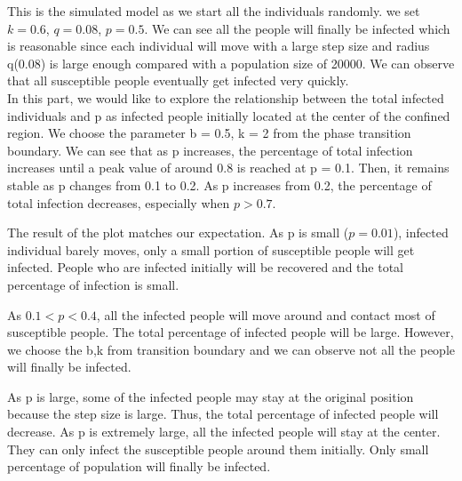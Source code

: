 \documentclass{article}
\begin{document}
This is the simulated model as we start all the individuals randomly. we set $k = 0.6$, $q = 0.08$, $p = 0.5$. We can see all the people will  finally be infected which is reasonable since each individual will move with a large step size and radius q(0.08) is large enough compared with a population size of 20000. We can observe that all susceptible people eventually get infected very quickly.\\

In this part, we would like to explore the relationship between the total infected individuals and p as infected people initially located at the center of the confined region. We choose the parameter b = 0.5, k = 2 from the phase transition boundary.
We can see that as p increases, the percentage of total infection increases until a peak value of around 0.8 is reached at p = 0.1. Then, it remains stable as p changes from 0.1 to 0.2. As p increases from 0.2, the percentage of total infection decreases, especially when $p > 0.7$.


The result of the plot matches our expectation. As p is small ($p=0.01$), infected individual barely moves, only a small portion of susceptible people will get infected. People who are infected initially will be recovered and the total percentage of infection is small.


As $ 0.1<p<0.4 $, all the infected people will move around and contact most of susceptible people. The total percentage of infected people will be large. However, we choose the b,k from transition boundary and we can observe not all the people will finally be infected.


As p is large, some of the infected people may stay at the original position because the step size is large. Thus, the total percentage of infected people will decrease. As p is extremely large, all the infected people will stay at the center. They can only infect the susceptible people around them initially. Only small percentage of population will finally be infected.\\
\end{document}
